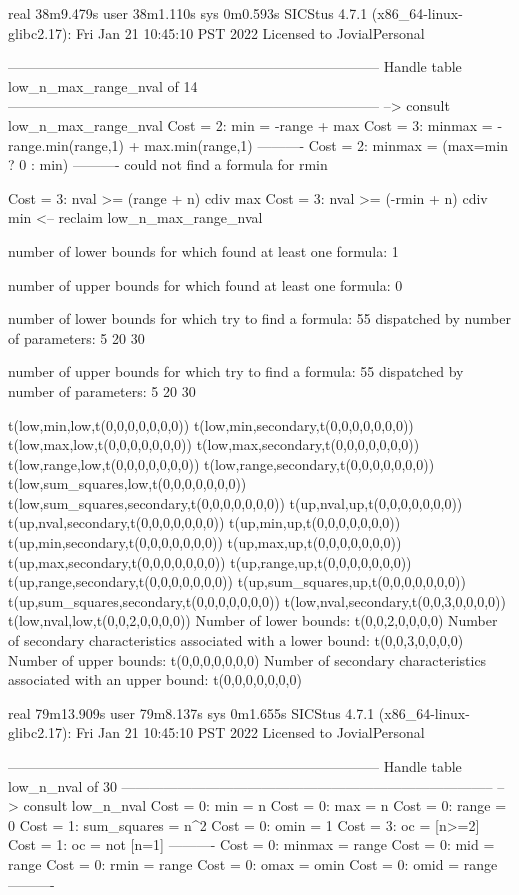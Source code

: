 real	38m9.479s
user	38m1.110s
sys	0m0.593s
SICStus 4.7.1 (x86_64-linux-glibc2.17): Fri Jan 21 10:45:10 PST 2022
Licensed to JovialPersonal


--------------------------------------------------------------------------------
Handle table low_n_max_range_nval of 14
--------------------------------------------------------------------------------
--> consult low_n_max_range_nval
Cost =  2:  min    = -range + max
Cost =  3:  minmax = -range.min(range,1) + max.min(range,1)
----------
Cost =  2:  minmax = (max=min ? 0 : min)
----------
could not find a formula for rmin

Cost =  3:  nval >= (range + n) cdiv max
Cost =  3:  nval >= (-rmin + n) cdiv min
<-- reclaim low_n_max_range_nval

number of lower bounds for which found at least one formula: 1

number of upper bounds for which found at least one formula: 0

number of lower bounds for which try to find a formula: 55
dispatched by number of parameters: 5  20  30

number of upper bounds for which try to find a formula: 55
dispatched by number of parameters: 5  20  30

t(low,min,low,t(0,0,0,0,0,0,0))
t(low,min,secondary,t(0,0,0,0,0,0,0))
t(low,max,low,t(0,0,0,0,0,0,0))
t(low,max,secondary,t(0,0,0,0,0,0,0))
t(low,range,low,t(0,0,0,0,0,0,0))
t(low,range,secondary,t(0,0,0,0,0,0,0))
t(low,sum_squares,low,t(0,0,0,0,0,0,0))
t(low,sum_squares,secondary,t(0,0,0,0,0,0,0))
t(up,nval,up,t(0,0,0,0,0,0,0))
t(up,nval,secondary,t(0,0,0,0,0,0,0))
t(up,min,up,t(0,0,0,0,0,0,0))
t(up,min,secondary,t(0,0,0,0,0,0,0))
t(up,max,up,t(0,0,0,0,0,0,0))
t(up,max,secondary,t(0,0,0,0,0,0,0))
t(up,range,up,t(0,0,0,0,0,0,0))
t(up,range,secondary,t(0,0,0,0,0,0,0))
t(up,sum_squares,up,t(0,0,0,0,0,0,0))
t(up,sum_squares,secondary,t(0,0,0,0,0,0,0))
t(low,nval,secondary,t(0,0,3,0,0,0,0))
t(low,nval,low,t(0,0,2,0,0,0,0))
Number of lower bounds:                                             t(0,0,2,0,0,0,0)
Number of secondary characteristics associated with a lower bound:  t(0,0,3,0,0,0,0)
Number of upper bounds:                                             t(0,0,0,0,0,0,0)
Number of secondary characteristics associated with an upper bound: t(0,0,0,0,0,0,0)

real	79m13.909s
user	79m8.137s
sys	0m1.655s
SICStus 4.7.1 (x86_64-linux-glibc2.17): Fri Jan 21 10:45:10 PST 2022
Licensed to JovialPersonal


--------------------------------------------------------------------------------
Handle table low_n_nval of 30
--------------------------------------------------------------------------------
--> consult low_n_nval
Cost =  0:  min         = n
Cost =  0:  max         = n
Cost =  0:  range       = 0
Cost =  1:  sum_squares = n^2
Cost =  0:  omin        = 1
Cost =  3:  oc          = [n>=2]
Cost =  1:  oc          = not [n=1]
----------
Cost =  0:  minmax      = range
Cost =  0:  mid         = range
Cost =  0:  rmin        = range
Cost =  0:  omax        = omin
Cost =  0:  omid        = range
----------

